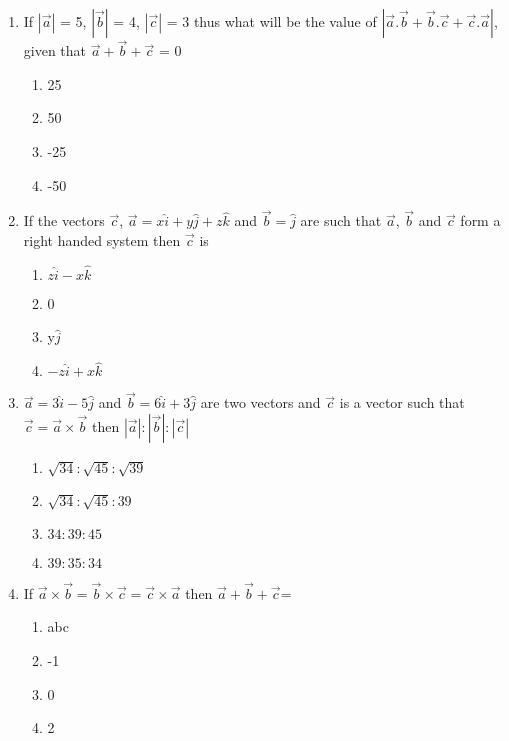 \begin{enumerate}[label=\arabic*.,ref=\thesubsection.\theenumi]
\item If $|\overrightarrow{a}|$ = 5, $|\overrightarrow{b}|$ = 4, $|\overrightarrow{c}|$ = 3 thus what will be the value of 
$|\overrightarrow{a}.\overrightarrow{b} + \overrightarrow{b}.\overrightarrow{c} + \overrightarrow{c}.\overrightarrow{a}|$, given that $\overrightarrow{a} + \overrightarrow{b} + \overrightarrow{c}$ = 0
\begin{enumerate}
\item 25
\item 50
\item -25
\item -50
\end{enumerate}

\item If the vectors $\overrightarrow{c}$, $\overrightarrow{a} = x\hat{i} + y\hat{j} + z\hat{k}$ and $\overrightarrow{b} = \hat{j}$ are such that $\overrightarrow{a}$, $\overrightarrow{b}$ and $\overrightarrow{c}$ form a right handed system then $\overrightarrow{c}$ is
\begin{enumerate}
\item $z\hat{i} - x\hat{k}$
\item 0
\item y$\hat{j}$
\item $-z\hat{i} + x\hat{k}$
\end{enumerate}

\item $\overrightarrow{a}=3\hat{i}-5\hat{j}$ and $\overrightarrow{b}=6\hat{i}+3\hat{j}$ are two vectors and $\overrightarrow{c}$ is a vector such that $\overrightarrow{c}=\overrightarrow{a} \times \overrightarrow{b}$ then 
$|\overrightarrow{a}|:|\overrightarrow{b}|:|\overrightarrow{c}|$
\begin{enumerate}
\item $\sqrt{34}:\sqrt{45}:\sqrt{39}$
\item $\sqrt{34}:\sqrt{45}:39$
\item $34:39:45$
\item $39:35:34$
\end{enumerate}

\item If $\overrightarrow{a} \times \overrightarrow{b} = \overrightarrow{b} \times \overrightarrow{c} = \overrightarrow{c} \times \overrightarrow{a}$ then $\overrightarrow{a}+\overrightarrow{b}+\overrightarrow{c}$=
\begin{enumerate}
\item abc
\item -1
\item 0
\item 2
\end{enumerate}


\end{enumerate}
